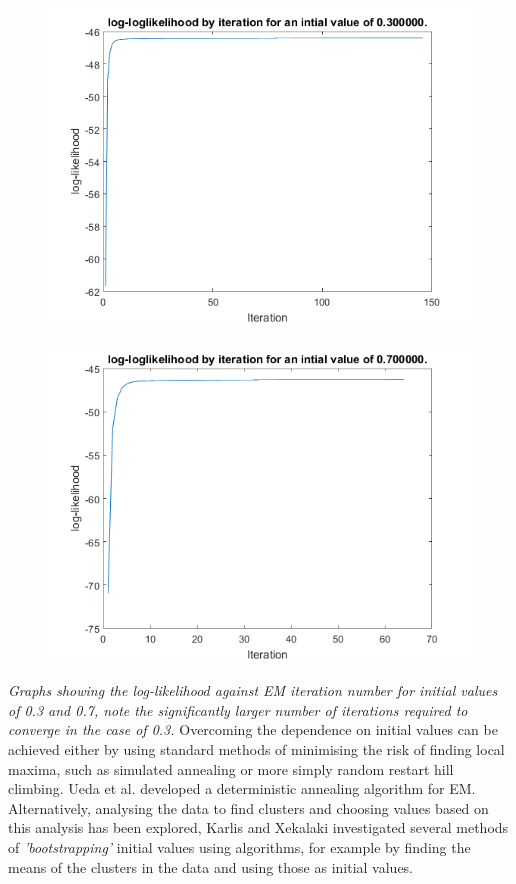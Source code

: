 \documentclass{article}
\begin{document}
\begin{figure}[h!]
\centering
\includegraphics[width=0.7\linewidth]{images/LL3}
\label{fig:LL2}
\end{figure}
\begin{figure}[h!]
\centering
\includegraphics[width=0.7\linewidth]{images/LL7}
\label{fig:LL7}
\end{figure}
\textit{Graphs showing the log-likelihood against EM iteration number for initial values of 0.3 and 0.7, note the significantly larger number of iterations required to converge in the case of 0.3.}
\newpage
Overcoming the dependence on initial values can be achieved either by using standard methods of minimising the risk of finding local maxima, such as simulated annealing or more simply random restart hill climbing. Ueda et al. developed a deterministic annealing algorithm for EM.\cite{ueda1998deterministic} Alternatively, analysing the data to find clusters and choosing values based on this analysis has been explored, Karlis and Xekalaki\cite{karlis2003choosing} investigated several methods of \textit{'bootstrapping'} initial values using algorithms, for example by finding the means of the clusters in the data and using those as initial values.
\end{document}
